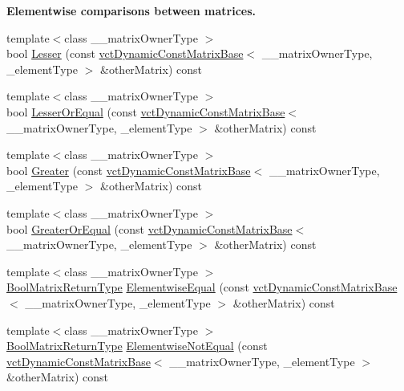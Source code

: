 \begin{Indent}{\bf Elementwise comparisons between matrices.}
\begin{DoxyCompactItemize}
\item 
{\footnotesize template$<$class \+\_\+\+\_\+matrix\+Owner\+Type $>$ }\\bool \hyperlink{classvct_dynamic_const_matrix_base_a467bfe8bb9c5d635a69f30f64f163317}{Lesser} (const \hyperlink{classvct_dynamic_const_matrix_base}{vct\+Dynamic\+Const\+Matrix\+Base}$<$ \+\_\+\+\_\+matrix\+Owner\+Type, \+\_\+element\+Type $>$ \&other\+Matrix) const 
\item 
{\footnotesize template$<$class \+\_\+\+\_\+matrix\+Owner\+Type $>$ }\\bool \hyperlink{classvct_dynamic_const_matrix_base_adefd715fcdc4067de82bfa98e298afde}{Lesser\+Or\+Equal} (const \hyperlink{classvct_dynamic_const_matrix_base}{vct\+Dynamic\+Const\+Matrix\+Base}$<$ \+\_\+\+\_\+matrix\+Owner\+Type, \+\_\+element\+Type $>$ \&other\+Matrix) const 
\item 
{\footnotesize template$<$class \+\_\+\+\_\+matrix\+Owner\+Type $>$ }\\bool \hyperlink{classvct_dynamic_const_matrix_base_ae99bf3423dcaea6f83a4e1ae8cd75f95}{Greater} (const \hyperlink{classvct_dynamic_const_matrix_base}{vct\+Dynamic\+Const\+Matrix\+Base}$<$ \+\_\+\+\_\+matrix\+Owner\+Type, \+\_\+element\+Type $>$ \&other\+Matrix) const 
\item 
{\footnotesize template$<$class \+\_\+\+\_\+matrix\+Owner\+Type $>$ }\\bool \hyperlink{classvct_dynamic_const_matrix_base_aa422fb2c17e117206ff444541eeab398}{Greater\+Or\+Equal} (const \hyperlink{classvct_dynamic_const_matrix_base}{vct\+Dynamic\+Const\+Matrix\+Base}$<$ \+\_\+\+\_\+matrix\+Owner\+Type, \+\_\+element\+Type $>$ \&other\+Matrix) const 
\item 
{\footnotesize template$<$class \+\_\+\+\_\+matrix\+Owner\+Type $>$ }\\\hyperlink{classvct_dynamic_const_matrix_base_ac71d88dda7abaaeb2276b83f2e49def7}{Bool\+Matrix\+Return\+Type} \hyperlink{classvct_dynamic_const_matrix_base_af08ccedcbb1f2c8fc7a3df18ee749b4d}{Elementwise\+Equal} (const \hyperlink{classvct_dynamic_const_matrix_base}{vct\+Dynamic\+Const\+Matrix\+Base}$<$ \+\_\+\+\_\+matrix\+Owner\+Type, \+\_\+element\+Type $>$ \&other\+Matrix) const 
\item 
{\footnotesize template$<$class \+\_\+\+\_\+matrix\+Owner\+Type $>$ }\\\hyperlink{classvct_dynamic_const_matrix_base_ac71d88dda7abaaeb2276b83f2e49def7}{Bool\+Matrix\+Return\+Type} \hyperlink{classvct_dynamic_const_matrix_base_add4e2d3b11d480a9b10c15e5f13e0f2c}{Elementwise\+Not\+Equal} (const \hyperlink{classvct_dynamic_const_matrix_base}{vct\+Dynamic\+Const\+Matrix\+Base}$<$ \+\_\+\+\_\+matrix\+Owner\+Type, \+\_\+element\+Type $>$ \&other\+Matrix) const 

\end{DoxyCompactItemize}
\end{Indent}

